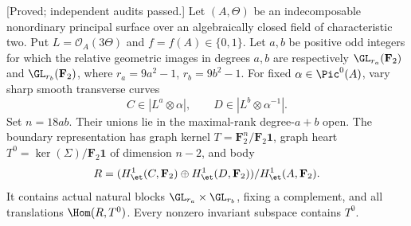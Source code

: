 \begin{proposition}
\label{prop:nonordinary-even-addition-boundary-candidate}
\textup{[Proved; independent audits passed.]}
Let $(A,\Theta)$ be an indecomposable nonordinary principal
surface over an algebraically closed field of characteristic
two. Put $L=\mathcal O_A(3\Theta)$ and $f=f(A)\in\{0,1\}$.
Let $a,b$ be positive odd integers for which the relative
geometric images in degrees $a,b$ are respectively
$\GL_{r_a}(\mathbf F_2)$ and $\GL_{r_b}(\mathbf F_2)$, where
$r_a=9a^2-1$, $r_b=9b^2-1$. For fixed $\alpha\in\Pic^0(A)$,
vary sharp smooth transverse curves
\[
       C\in|L^a\otimes\alpha|,\qquad
       D\in|L^b\otimes\alpha^{-1}|.
\]
Set $n=18ab$. Their unions lie in the maximal-rank degree-$a+b$
open. The boundary representation has graph kernel
$T=\mathbf F_2^n/\mathbf F_2\mathbf1$, graph heart
$T^0=\ker(\Sigma)/\mathbf F_2\mathbf1$ of dimension $n-2$,
and body
\[
       R=(H^1_{\et}(C,\mathbf F_2)\oplus
             H^1_{\et}(D,\mathbf F_2))/H^1_{\et}(A,\mathbf F_2).
\]
It contains actual natural blocks $\GL_{r_a}\times\GL_{r_b}$,
fixing a complement, and all translations $\Hom(R,T^0)$.
Every nonzero invariant subspace contains $T^0$.
\end{proposition}
